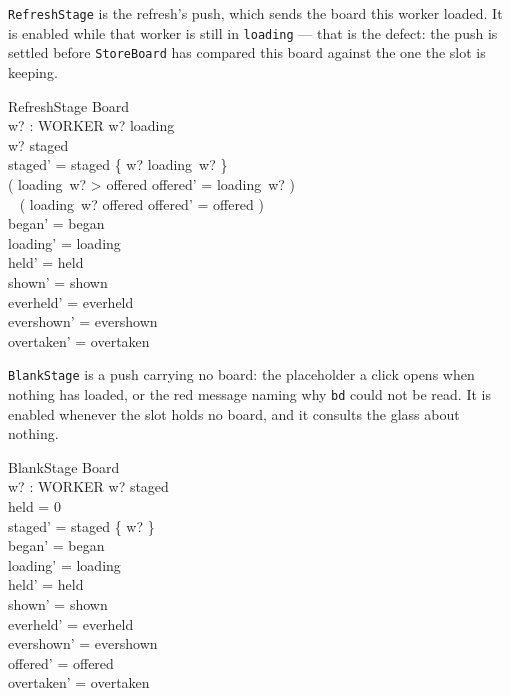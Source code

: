 \documentclass[a4paper,10pt,fleqn]{article}
\begin{document}
\texttt{RefreshStage} is the refresh's push, which sends the board this worker
loaded. It is enabled while that worker is still in \texttt{loading} --- that is
the defect: the push is settled before \texttt{StoreBoard} has compared this
board against the one the slot is keeping.

\begin{schema}{RefreshStage}
  \Delta Board \\
  w? : WORKER
\where
  w? \in \dom loading \\
  w? \notin \dom staged \\
  staged' = staged \cup \{ w? \mapsto loading~w? \} \\
  ( loading~w? > offered \land offered' = loading~w? ) \lor \\
  \quad~ ( loading~w? \leq offered \land offered' = offered ) \\
  began' = began \\
  loading' = loading \\
  held' = held \\
  shown' = shown \\
  everheld' = everheld \\
  evershown' = evershown \\
  overtaken' = overtaken
\end{schema}

\texttt{BlankStage} is a push carrying no board: the placeholder a click opens
when nothing has loaded, or the red message naming why \texttt{bd} could not be
read. It is enabled whenever the slot holds no board, and it consults the glass
about nothing.

\begin{schema}{BlankStage}
  \Delta Board \\
  w? : WORKER
\where
  w? \notin \dom staged \\
  held = 0 \\
  staged' = staged \cup \{ w?  \} \\
  began' = began \\
  loading' = loading \\
  held' = held \\
  shown' = shown \\
  everheld' = everheld \\
  evershown' = evershown \\
  offered' = offered \\
  overtaken' = overtaken
\end{schema}
\end{document}
